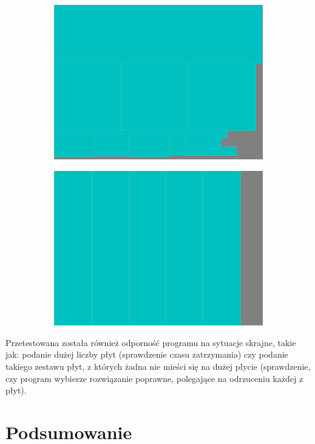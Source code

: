 \documentclass[11pt,a4paper,oneside]{article}
\begin{document}
\begin{figure}[H]
\begin{subfigure}{.49\textwidth}
    \centering
    \includegraphics[width=.95\linewidth]{res/result1.pdf}
    \caption{}
\end{subfigure}
\hfill
\begin{subfigure}{.49\textwidth}
    \centering
    \includegraphics[width=.95\linewidth]{res/result2.pdf}
    \caption{}
\end{subfigure}
\caption{}
\label{fig:fig3}
\end{figure}

Przetestowana została również odporność programu na sytuacje skrajne, takie jak: podanie dużej liczby płyt (sprawdzenie czasu zatrzymania) czy podanie takiego zestawu płyt, z których żadna nie mieści się na dużej płycie (sprawdzenie, czy program wybierze rozwiązanie poprawne, polegające na odrzuceniu każdej z płyt).

\section{Podsumowanie}
\end{document}
